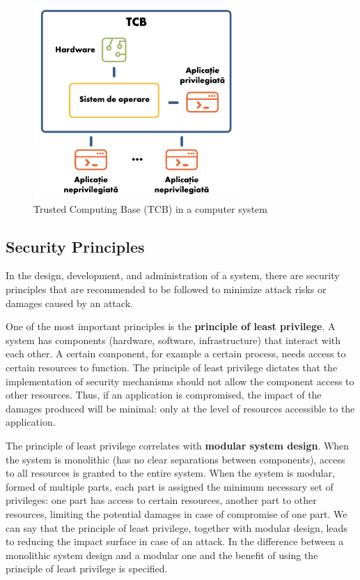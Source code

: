 \begin{figure}[htbp]
  \centering
  \def\svgwidth{\columnwidth}
  \includegraphics[width=0.7\textwidth]{chapters/12-auth/img/tcb.svg.pdf}
  \caption{Trusted Computing Base (TCB) in a computer system}
  \label{fig:sec:tcb}
\end{figure}

\subsection{Security Principles}
\label{sec:sec:fundamentals:principles}

In the design, development, and administration of a system, there are security principles that are recommended to be followed to minimize attack risks or damages caused by an attack.

One of the most important principles is the \textbf{principle of least privilege}.
A system has components (hardware, software, infrastructure) that interact with each other.
A certain component, for example a certain process, needs access to certain resources to function.
The principle of least privilege dictates that the implementation of security mechanisms should not allow the component access to other resources.
Thus, if an application is compromised, the impact of the damages produced will be minimal: only at the level of resources accessible to the application.

The principle of least privilege correlates with \textbf{modular system design}.
When the system is monolithic (has no clear separations between components), access to all resources is granted to the entire system.
When the system is modular, formed of multiple parts, each part is assigned the minimum necessary set of privileges: one part has access to certain resources, another part to other resources, limiting the potential damages in case of compromise of one part.
We can say that the principle of least privilege, together with modular design, leads to reducing the impact surface in case of an attack.
In  the difference between a monolithic system design and a modular one and the benefit of using the principle of least privilege is specified.

